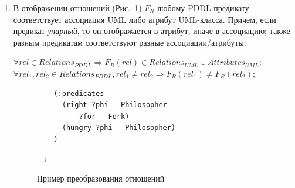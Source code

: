 \documentclass[a4paper,14pt]{extreport}
\begin{document}
\begin{enumerate}
        \item В отображении отношений (Рис.~\ref{img:property-relations}) $F_R$ любому PDDL-предикату соответствует ассоциация UML либо атрибут UML-класса.
 Причем, если предикат \textit{унарный}, то он отображается в атрибут, иначе в ассоциацию; также разным предикатам соответствуют разные ассоциации/атрибуты:
    
        \begin{center}
        $\forall rel \in Relations_{PDDL} \Rightarrow F_R(rel) \in Relations_{UML} \cup Attributes_{UML}$;\\
        $\forall rel_1, rel_2 \in Relations_{PDDL}, rel_1 \neq rel_2 \Rightarrow F_R(rel_1) \neq F_R(rel_2)$; \\
        \end{center}

    
\begin{figure}[h]
    \hfill
    \begin{minipage}[h]{0.50\linewidth}
        {\raggedright
        \begin{verbatim}
    (:predicates
      (right ?phi - Philosopher 
          ?for - Fork)
      (hungry ?phi - Philosopher)
    )
        \end{verbatim} 
        }
    \end{minipage}
    \hfill
    $\rightarrow$
    \hfill
    \begin{minipage}[h]{0.45\linewidth}
    \end{minipage}
    \caption{Пример преобразования отношений}
    \label{img:property-relations}
\end{figure}       



\end{enumerate}
\end{document}
